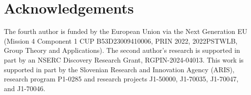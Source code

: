\documentclass[11pt]{amsart}
\numberwithin{equation}{section}
\theoremstyle{definition}
\begin{document}
	\section*{Acknowledgements}
	The fourth author is funded by the European Union via the Next
	Generation EU (Mission 4 Component 1 CUP B53D23009410006, PRIN 2022, 2022PSTWLB, Group
	Theory and Applications). The second author's research is supported in part by an NSERC Discovery Research Grant, RGPIN-2024-04013.  This work is supported in part by the Slovenian Research and Innovation Agency (ARIS), research program P1-0285 and research projects J1-50000, J1-70035, J1-70047, and J1-70046.
	
    \providecommand{\bysame}{\leavevmode\hbox to3em{\hrulefill}\thinspace}
\providecommand{\MR}{\relax\ifhmode\unskip\space\fi MR }
\providecommand{\MRhref}[2]{%
  \href{http://www.ams.org/mathscinet-getitem?mr=#1}{#2}
}
\providecommand{\href}[2]{#2}
\end{document}
